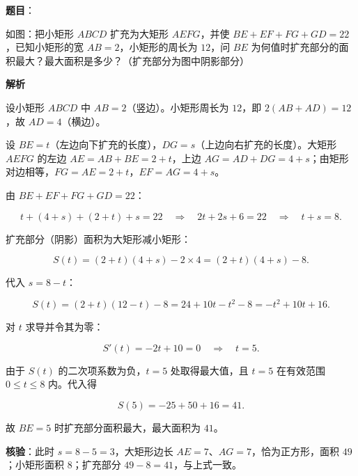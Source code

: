 \begin{answer}

\textbf{题目}：

如图：把小矩形 $ABCD$ 扩充为大矩形 $AEFG$，并使 $BE+EF+FG+GD=22$，已知小矩形的宽 $AB=2$，小矩形的周长为 $12$，问 $BE$ 为何值时扩充部分的面积最大？最大面积是多少？（扩充部分为图中阴影部分）
\nopagebreak[4]
\begin{center}\end{center}
\nopagebreak[4]
\textbf{解析}

设小矩形 $ABCD$ 中 $AB=2$（竖边）。小矩形周长为 $12$，即 $2(AB+AD)=12$，故 $AD=4$（横边）。

设 $BE=t$（左边向下扩充的长度），$DG=s$（上边向右扩充的长度）。大矩形 $AEFG$ 的左边 $AE=AB+BE=2+t$，上边 $AG=AD+DG=4+s$；由矩形对边相等，$FG=AE=2+t$，$EF=AG=4+s$。

由 $BE+EF+FG+GD=22$：

\nopagebreak[4]
\[
t+(4+s)+(2+t)+s=22
\quad\Longrightarrow\quad
2t+2s+6=22
\quad\Longrightarrow\quad
t+s=8.
\]

扩充部分（阴影）面积为大矩形减小矩形：

\nopagebreak[4]
\[
S(t)=(2+t)(4+s)-2\times4=(2+t)(4+s)-8.
\]

代入 $s=8-t$：

\nopagebreak[4]
\[
S(t)=(2+t)(12-t)-8=24+10t-t^2-8=-t^2+10t+16.
\]

对 $t$ 求导并令其为零：

\nopagebreak[4]
\[
S'(t)=-2t+10=0\quad\Longrightarrow\quad t=5.
\]

由于 $S(t)$ 的二次项系数为负，$t=5$ 处取得最大值，且 $t=5$ 在有效范围 $0\le t\le8$ 内。代入得

\nopagebreak[4]
\[
S(5)=-25+50+16=41.
\]

故 $BE=5$ 时扩充部分面积最大，最大面积为 $41$。

\begin{gktip}
\textbf{核验}：此时 $s=8-5=3$，大矩形边长 $AE=7$、$AG=7$，恰为正方形，面积 $49$；小矩形面积 $8$；扩充部分 $49-8=41$，与上式一致。
\end{gktip}


\end{answer}
